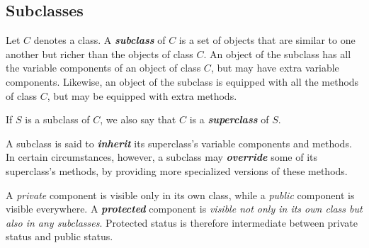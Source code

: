 \subsection{Subclasses}
\label{subsec:subclasses}

Let $C$ denotes a class. A \textit{\textbf{subclass}} of $C$ is a set of objects that are similar to one another but richer than the objects of class $C$. An object of the subclass has all the variable components of an object of class $C$, but may have extra variable components. Likewise, an object of the subclass is equipped with all the methods of class $C$, but may be equipped with extra methods.

If $S$ is a subclass of $C$, we also say that $C$ is a \textit{\textbf{superclass}} of $S$.

A subclass is said to \textit{\textbf{inherit}} its superclass's variable components and methods. In certain circumstances, however, a subclass may \textit{\textbf{override}} some of its superclass's methods, by providing more specialized versions of these methods.

A \textit{private} component is visible only in its own class, while a \textit{public} component is visible everywhere. A \textit{\textbf{protected}} component is \textit{visible not only in its own class but also in any subclasses}. Protected status is therefore intermediate between private status and public status.
